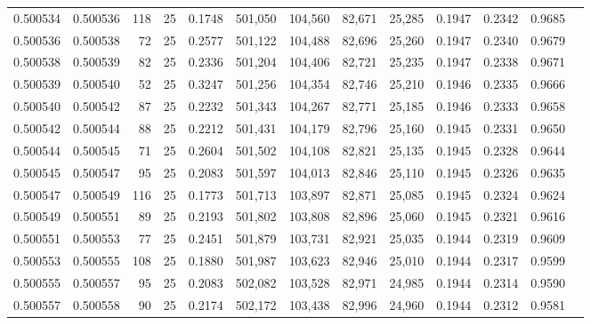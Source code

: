 \begin{tabular}{rrrrrrrrrrrrr}
0.500534 & 0.500536 & 118 &  25 &                                     0.1748 & 501,050 & 104,560 &  82,671 &  25,285 & 0.1947 & 0.2342 & 0.9685 \\
0.500536 & 0.500538 &  72 &  25 &                                     0.2577 & 501,122 & 104,488 &  82,696 &  25,260 & 0.1947 & 0.2340 & 0.9679 \\
0.500538 & 0.500539 &  82 &  25 &                                     0.2336 & 501,204 & 104,406 &  82,721 &  25,235 & 0.1947 & 0.2338 & 0.9671 \\
0.500539 & 0.500540 &  52 &  25 &                                     0.3247 & 501,256 & 104,354 &  82,746 &  25,210 & 0.1946 & 0.2335 & 0.9666 \\
0.500540 & 0.500542 &  87 &  25 &                                     0.2232 & 501,343 & 104,267 &  82,771 &  25,185 & 0.1946 & 0.2333 & 0.9658 \\
0.500542 & 0.500544 &  88 &  25 &                                     0.2212 & 501,431 & 104,179 &  82,796 &  25,160 & 0.1945 & 0.2331 & 0.9650 \\
0.500544 & 0.500545 &  71 &  25 &                                     0.2604 & 501,502 & 104,108 &  82,821 &  25,135 & 0.1945 & 0.2328 & 0.9644 \\
0.500545 & 0.500547 &  95 &  25 &                                     0.2083 & 501,597 & 104,013 &  82,846 &  25,110 & 0.1945 & 0.2326 & 0.9635 \\
0.500547 & 0.500549 & 116 &  25 &                                     0.1773 & 501,713 & 103,897 &  82,871 &  25,085 & 0.1945 & 0.2324 & 0.9624 \\
0.500549 & 0.500551 &  89 &  25 &                                     0.2193 & 501,802 & 103,808 &  82,896 &  25,060 & 0.1945 & 0.2321 & 0.9616 \\
0.500551 & 0.500553 &  77 &  25 &                                     0.2451 & 501,879 & 103,731 &  82,921 &  25,035 & 0.1944 & 0.2319 & 0.9609 \\
0.500553 & 0.500555 & 108 &  25 &                                     0.1880 & 501,987 & 103,623 &  82,946 &  25,010 & 0.1944 & 0.2317 & 0.9599 \\
0.500555 & 0.500557 &  95 &  25 &                                     0.2083 & 502,082 & 103,528 &  82,971 &  24,985 & 0.1944 & 0.2314 & 0.9590 \\
0.500557 & 0.500558 &  90 &  25 &                                     0.2174 & 502,172 & 103,438 &  82,996 &  24,960 & 0.1944 & 0.2312 & 0.9581 \\

\end{tabular}
